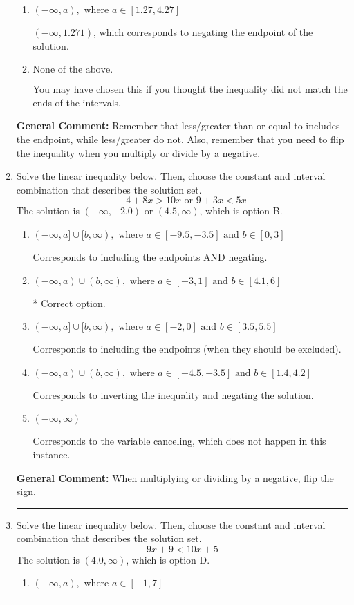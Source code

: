 \documentclass{extbook}[14pt]
\newcommand{\litem}[1]{\item #1

\rule{\textwidth}{0.4pt}}
\begin{document}
\begin{enumerate}
{\begin{enumerate}[label=\Alph*.]
 $(1.271, \infty)$, which corresponds to switching the direction of the interval AND negating the endpoint. You likely did this if you did not flip the inequality when dividing by a negative as well as not moving values over to a side properly.
\item \( (-\infty, a), \text{ where } a \in [1.27, 4.27] \)

 $(-\infty, 1.271)$, which corresponds to negating the endpoint of the solution.
\item \( \text{None of the above}. \)

You may have chosen this if you thought the inequality did not match the ends of the intervals.
\end{enumerate}

\textbf{General Comment:} Remember that less/greater than or equal to includes the endpoint, while less/greater do not. Also, remember that you need to flip the inequality when you multiply or divide by a negative.
}
\litem{
Solve the linear inequality below. Then, choose the constant and interval combination that describes the solution set.
\[ -4 + 8 x > 10 x \text{ or } 9 + 3 x < 5 x \]
The solution is \( (-\infty, -2.0) \text{ or } (4.5, \infty) \), which is option B.\begin{enumerate}[label=\Alph*.]
\item \( (-\infty, a] \cup [b, \infty), \text{ where } a \in [-9.5, -3.5] \text{ and } b \in [0, 3] \)

Corresponds to including the endpoints AND negating.
\item \( (-\infty, a) \cup (b, \infty), \text{ where } a \in [-3, 1] \text{ and } b \in [4.1, 6] \)

 * Correct option.
\item \( (-\infty, a] \cup [b, \infty), \text{ where } a \in [-2, 0] \text{ and } b \in [3.5, 5.5] \)

Corresponds to including the endpoints (when they should be excluded).
\item \( (-\infty, a) \cup (b, \infty), \text{ where } a \in [-4.5, -3.5] \text{ and } b \in [1.4, 4.2] \)

Corresponds to inverting the inequality and negating the solution.
\item \( (-\infty, \infty) \)

Corresponds to the variable canceling, which does not happen in this instance.
\end{enumerate}

\textbf{General Comment:} When multiplying or dividing by a negative, flip the sign.
}
\litem{
Solve the linear inequality below. Then, choose the constant and interval combination that describes the solution set.
\[ 9x + 9 < 10x + 5 \]
The solution is \( (4.0, \infty) \), which is option D.\begin{enumerate}[label=\Alph*.]
\item \( (-\infty, a), \text{ where } a \in [-1, 7] \)


\end{enumerate}}
\end{enumerate}
\end{document}
